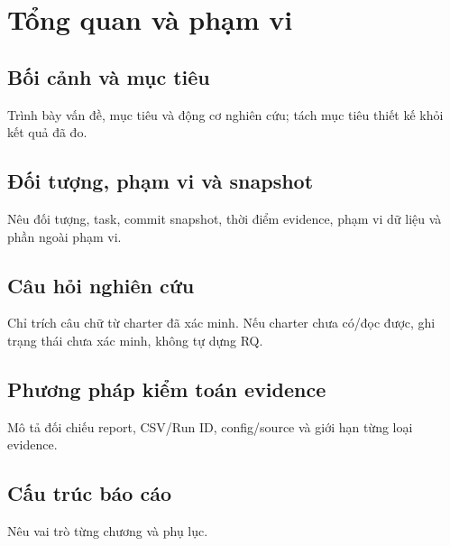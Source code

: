 \chapter{Tổng quan và phạm vi}
\section{Bối cảnh và mục tiêu}
Trình bày vấn đề, mục tiêu và động cơ nghiên cứu; tách mục tiêu thiết kế khỏi kết quả đã đo.
\section{Đối tượng, phạm vi và snapshot}
Nêu đối tượng, task, commit snapshot, thời điểm evidence, phạm vi dữ liệu và phần ngoài phạm vi.
\section{Câu hỏi nghiên cứu}
Chỉ trích câu chữ từ charter đã xác minh. Nếu charter chưa có/đọc được, ghi trạng thái chưa xác minh, không tự dựng RQ.
\section{Phương pháp kiểm toán evidence}
Mô tả đối chiếu report, CSV/Run ID, config/source và giới hạn từng loại evidence.
\section{Cấu trúc báo cáo}
Nêu vai trò từng chương và phụ lục.